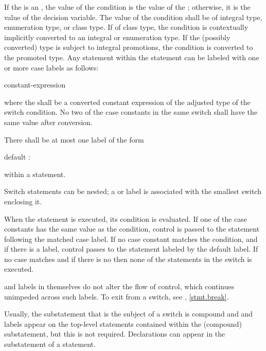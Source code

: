\pnum
If the  is an ,
the value of the condition is the value of the ;
otherwise, it is the value of the decision variable.
The value of the condition shall be of integral type, enumeration type, or class
type. If of class type, the
condition is contextually implicitly converted to
an integral or enumeration type.
If the (possibly converted) type is subject to integral
promotions, the condition is converted
to the promoted type.
Any
statement within the  statement can be labeled with one or
more case labels as follows:
\begin{ncbnf}
%
 constant-expression \terminal{:}
\end{ncbnf}
where the  shall be
a converted constant expression of the
adjusted type of the switch condition. No two of the case constants in
the same switch shall have the same value after conversion.

\pnum
{}%
There shall be at most one label of the form
\begin{codeblock}
default :
\end{codeblock}
within a  statement.

\pnum
Switch statements can be nested; a  or  label
is associated with the smallest switch enclosing it.

\pnum
When the  statement is executed, its condition is
evaluated.
%
If one of the case constants has the same value as the condition,
control is passed to the statement following the matched case label. If
no case constant matches the condition, and if there is a
%
 label, control passes to the statement labeled by the
default label. If no case matches and if there is no 
then none of the statements in the switch is executed.

\pnum
{} and  labels in themselves do not alter the
flow of control, which continues unimpeded across such labels. To exit
from a switch, see , \ref{stmt.break}.
\begin{note}
Usually, the substatement that is the subject of a switch is compound
and  and  labels appear on the top-level
statements contained within the (compound) substatement, but this is not
required.
%
Declarations can appear in the substatement of a
 statement.
\end{note}

